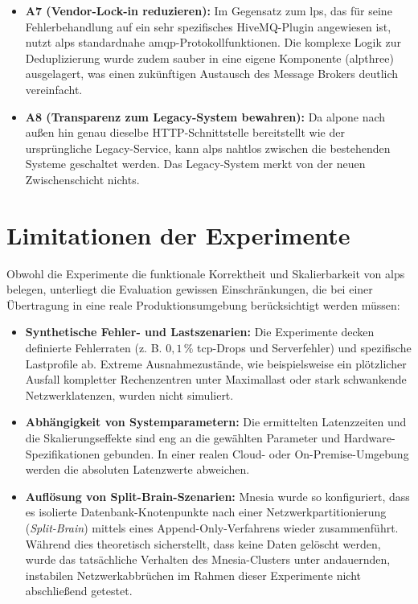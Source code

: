 \begin{itemize}
    \item \textbf{A7 (Vendor-Lock-in reduzieren):} Im Gegensatz zum \gls{lps}, das für seine Fehlerbehandlung auf ein sehr spezifisches HiveMQ-Plugin angewiesen ist, nutzt \gls{alps} standardnahe \gls{amqp}-Protokollfunktionen. Die komplexe Logik zur Deduplizierung wurde zudem sauber in eine eigene Komponente (\gls{alpthree}) ausgelagert, was einen zukünftigen Austausch des Message Brokers deutlich vereinfacht.

    \item \textbf{A8 (Transparenz zum Legacy-System bewahren):} Da \gls{alpone} nach außen hin genau dieselbe HTTP-Schnittstelle bereitstellt wie der ursprüngliche Legacy-Service, kann \gls{alps} nahtlos zwischen die bestehenden Systeme geschaltet werden. Das Legacy-System merkt von der neuen Zwischenschicht nichts.
\end{itemize}

\section{Limitationen der Experimente}

Obwohl die Experimente die funktionale Korrektheit und Skalierbarkeit von \gls{alps} belegen, unterliegt die Evaluation gewissen Einschränkungen, die bei einer Übertragung in eine reale Produktionsumgebung berücksichtigt werden müssen:

\begin{itemize}
    \item \textbf{Synthetische Fehler- und Lastszenarien:} Die Experimente decken definierte Fehlerraten (z. B. $0,1\,\%$ \gls{tcp}-Drops und Serverfehler) und spezifische Lastprofile ab. Extreme Ausnahmezustände, wie beispielsweise ein plötzlicher Ausfall kompletter Rechenzentren unter Maximallast oder stark schwankende Netzwerklatenzen, wurden nicht simuliert.

    \item \textbf{Abhängigkeit von Systemparametern:} Die ermittelten Latenzzeiten und die Skalierungseffekte sind eng an die gewählten Parameter und Hardware-Spezifikationen gebunden. In einer realen Cloud- oder On-Premise-Umgebung werden die absoluten Latenzwerte abweichen.

    \item \textbf{Auflösung von Split-Brain-Szenarien:} Mnesia wurde so konfiguriert, dass es isolierte Datenbank-Knotenpunkte nach einer Netzwerkpartitionierung (\textit{Split-Brain}) mittels eines Append-Only-Verfahrens wieder zusammenführt. Während dies theoretisch sicherstellt, dass keine Daten gelöscht werden, wurde das tatsächliche Verhalten des Mnesia-Clusters unter andauernden, instabilen Netzwerkabbrüchen im Rahmen dieser Experimente nicht abschließend getestet.
\end{itemize}

